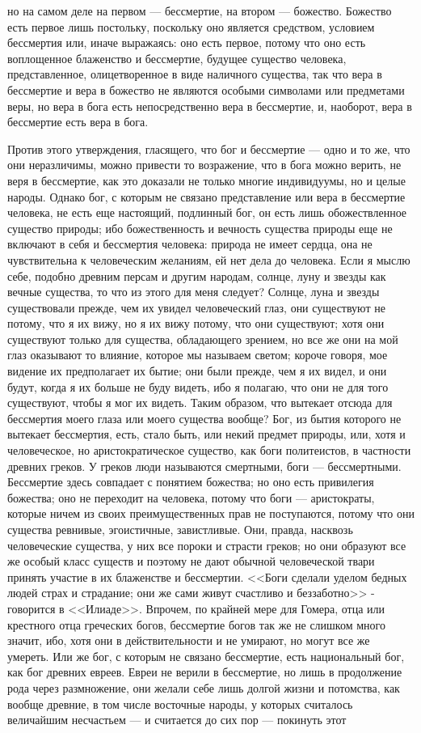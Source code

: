 \documentclass[12pt]{article}
\begin{document}
но на самом деле на первом --- бессмертие, на втором --- божество. Божество есть первое лишь постольку, поскольку оно является средством, условием бессмертия или, иначе выражаясь: оно есть первое, потому что оно есть воплощенное блаженство и бессмертие, будущее существо человека, представленное, олицетворенное в виде наличного существа, так что вера в бессмертие и вера в божество не являются особыми символами или предметами веры, но вера в бога есть непосредственно вера в бессмертие, и, наоборот, вера в бессмертие есть вера в бога. 

Против этого утверждения, гласящего, что бог и бессмертие --- одно и то же, что они неразличимы, можно привести то возражение, что в бога можно верить, не веря в бессмертие, как это доказали не только многие индивидуумы, но и целые народы. Однако бог, с которым не связано представление или вера в бессмертие человека, не есть еще настоящий, подлинный бог, он есть лишь обожествленное существо природы; ибо божественность и вечность существа природы еще не включают в себя и бессмертия человека: природа не имеет сердца, она не чувствительна к человеческим желаниям, ей нет дела до человека. Если я мыслю себе, подобно древним персам и другим народам, солнце, луну и звезды как вечные существа, то что из этого для меня следует? Солнце, луна и звезды существовали прежде, чем их увидел человеческий глаз, они существуют не потому, что я их вижу, но я их вижу потому, что они существуют; хотя они существуют только для существа, обладающего зрением, но все же они на мой глаз оказывают то влияние, которое мы называем светом; короче говоря, мое видение их предполагает их бытие; они были прежде, чем я их видел, и они будут, когда я их больше не буду видеть, ибо я полагаю, что они не для того существуют, чтобы я мог их видеть. Таким образом, что вытекает отсюда для бессмертия моего глаза или моего существа вообще? Бог, из бытия которого не вытекает бессмертия, есть, стало быть, или некий предмет природы, или, хотя и человеческое, но аристократическое существо, как боги политеистов, в частности древних греков. У греков люди называются смертными, боги --- бессмертными. Бессмертие здесь совпадает с понятием божества; но оно есть привилегия божества; оно не переходит на человека, потому что боги --- аристократы, которые ничем из своих преимущественных прав не поступаются, потому что они существа ревнивые, эгоистичные, завистливые. Они, правда, насквозь человеческие существа, у них все пороки и страсти греков; но они образуют все же особый класс существ и поэтому не дают обычной человеческой твари принять участие в их блаженстве и бессмертии. <<Боги сделали уделом бедных людей страх и страдание; они же сами живут счастливо и беззаботно>> - говорится в <<Илиаде>>. Впрочем, по крайней мере для Гомера, отца или крестного отца греческих богов, бессмертие богов так же не слишком много значит, ибо, хотя они в действительности и не умирают, но могут все же умереть. Или же бог, с которым не связано бессмертие, есть национальный бог, как бог древних евреев. Евреи не верили в бессмертие, но лишь в продолжение рода через размножение, они желали себе лишь долгой жизни и потомства, как вообще древние, в том числе восточные народы, у которых считалось величайшим несчастьем --- и считается до сих пор --- покинуть этот 
\end{document}
